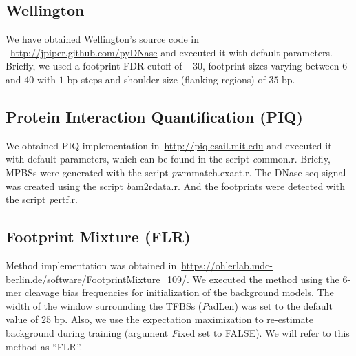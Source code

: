 \subsection{Wellington}
\label{sec:wellington}

We have obtained Wellington's source code in ~\url{http://jpiper.github.com/pyDNase} and executed it with default parameters. Briefly, we used a footprint FDR cutoff of $-30$, footprint sizes varying between $6$ and $40$ with $1$ bp steps and shoulder size (flanking regions) of $35$ bp.

\subsection{Protein Interaction Quantification (PIQ)}
\label{sec:piq}

We obtained PIQ implementation in~\url{http://piq.csail.mit.edu} and executed it with default parameters, which can be found in the script {\emph common.r}. Briefly, MPBSs were generated with the script {\emph pwmmatch.exact.r}. The DNase-seq signal was created using the script {\emph bam2rdata.r}. And the footprints were detected with the script {\emph pertf.r}.

\subsection{Footprint Mixture (FLR)}
\label{sec:flr}

Method implementation was obtained in~\url{https://ohlerlab.mdc-berlin.de/software/FootprintMixture_109/}. We executed the method using the $6$-mer cleavage bias frequencies for initialization of the background models. The width of the window surrounding the TFBSs ({\emph PadLen}) was set to the default value of $25$ bp. Also, we use the expectation maximization to re-estimate background during training (argument {\emph Fixed} set to FALSE). We will refer to this method as ``FLR''.

